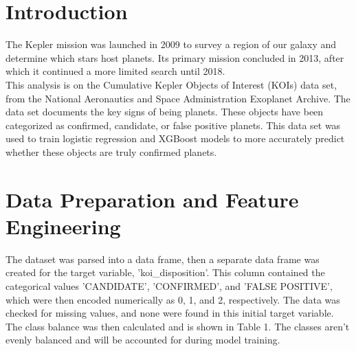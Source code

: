 \documentclass[10pt,twocolumn,letterpaper]{article}
\begin{document}

\section{Introduction}
The Kepler mission was launched in 2009 to survey a region of our galaxy and determine which stars host planets. Its primary mission concluded in 2013, after which it continued a more limited search until 2018.\\

This analysis is on the Cumulative Kepler Objects of Interest (KOIs) data set, from the National Aeronautics and Space Administration Exoplanet Archive. The data set documents the key signs of being planets. These objects have been categorized as confirmed, candidate, or false positive planets. This data set was used to train logistic regression and XGBoost models to more accurately predict whether these objects are truly confirmed planets. 

\section{Data Preparation and Feature Engineering}

The dataset was parsed into a data frame, then a separate data frame was created for the target variable, 'koi\_disposition'. This column contained the categorical values 'CANDIDATE', 'CONFIRMED', and 'FALSE POSITIVE', which were then encoded numerically as 0, 1, and 2, respectively. The data was checked for missing values, and none were found in this initial target variable. The class balance was then calculated and is shown in Table 1. The classes aren't evenly balanced and will be accounted for during model training. 
\end{document}
